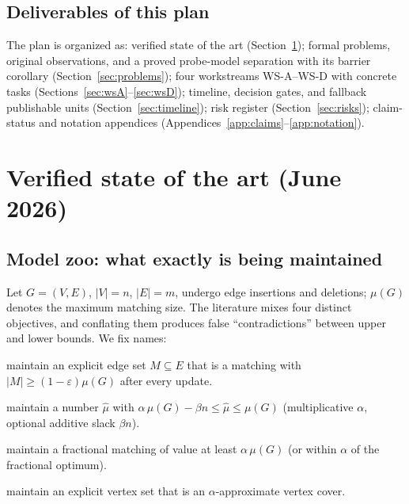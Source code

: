\documentclass[11pt]{article}
\theoremstyle{definition}
\theoremstyle{remark}
\newcommand{\eps}{\varepsilon}
\newcommand{\mm}{\mu}
\begin{document}
\subsection{Deliverables of this plan}

The plan is organized as: verified state of the art
(Section~\ref{sec:sota}); formal problems, original observations, and a
proved probe-model separation with its barrier corollary
(Section~\ref{sec:problems}); four workstreams WS-A--WS-D with concrete
tasks (Sections~\ref{sec:wsA}--\ref{sec:wsD}); timeline, decision gates,
and fallback publishable units (Section~\ref{sec:timeline}); risk
register (Section~\ref{sec:risks}); claim-status and notation appendices
(Appendices~\ref{app:claims}--\ref{app:notation}).

\section{Verified state of the art (June 2026)}
\label{sec:sota}

\subsection{Model zoo: what exactly is being maintained}
\label{sec:models}

Let $G=(V,E)$, $|V|=n$, $|E|=m$, undergo edge insertions and deletions;
$\mm(G)$ denotes the maximum matching size. The literature mixes four
distinct objectives, and conflating them produces false ``contradictions''
between upper and lower bounds. We fix names:

\begin{description}[itemsep=2pt]
\item[\textsc{Edges}$(\eps)$:] maintain an explicit edge set $M\subseteq E$
that is a matching with $|M|\ge (1-\eps)\mm(G)$ after every update.
\item[\textsc{Size}$(\alpha)$ / \textsc{Size}$(\alpha,\beta n)$:] maintain
a number $\hat{\mm}$ with $\alpha\,\mm(G)-\beta n \le \hat{\mm}\le \mm(G)$
(multiplicative $\alpha$, optional additive slack $\beta n$).
\item[\textsc{Frac}$(\alpha)$:] maintain a fractional matching of value at
least $\alpha\,\mm(G)$ (or within $\alpha$ of the fractional optimum).
\item[\textsc{Witness-VC}$(\alpha)$:] maintain an explicit vertex set that
is an $\alpha$-approximate vertex cover.
\end{description}
\end{document}
